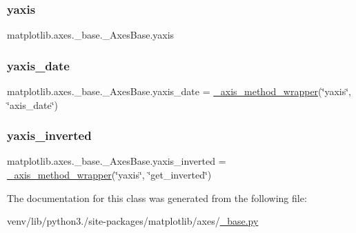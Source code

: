 \subsubsection{\texorpdfstring{yaxis}{yaxis}}
{\footnotesize\ttfamily matplotlib.\+axes.\+\_\+base.\+\_\+\+Axes\+Base.\+yaxis}

\mbox{\label{classmatplotlib_1_1axes_1_1__base_1_1__AxesBase_a678a7fa9e1dc60857f1a9dc5306e2e4a}} 
\subsubsection{\texorpdfstring{yaxis\+\_\+date}{yaxis\_date}}
{\footnotesize\ttfamily matplotlib.\+axes.\+\_\+base.\+\_\+\+Axes\+Base.\+yaxis\+\_\+date = \hyperlink{classmatplotlib_1_1axes_1_1__base_1_1__axis__method__wrapper}{\+\_\+axis\+\_\+method\+\_\+wrapper}(\char`\"{}yaxis\char`\"{}, \char`\"{}axis\+\_\+date\char`\"{})\hspace{0.3cm}{\ttfamily [static]}}

\mbox{\label{classmatplotlib_1_1axes_1_1__base_1_1__AxesBase_acbda8c6ae3c0395bc93cd02b1c0c5e33}} 
\subsubsection{\texorpdfstring{yaxis\+\_\+inverted}{yaxis\_inverted}}
{\footnotesize\ttfamily matplotlib.\+axes.\+\_\+base.\+\_\+\+Axes\+Base.\+yaxis\+\_\+inverted = \hyperlink{classmatplotlib_1_1axes_1_1__base_1_1__axis__method__wrapper}{\+\_\+axis\+\_\+method\+\_\+wrapper}(\char`\"{}yaxis\char`\"{}, \char`\"{}get\+\_\+inverted\char`\"{})\hspace{0.3cm}{\ttfamily [static]}}



The documentation for this class was generated from the following file\+:\begin{DoxyCompactItemize}
\item 
venv/lib/python3./site-\/packages/matplotlib/axes/\hyperlink{matplotlib_2axes_2__base_8py}{\+\_\+base.\+py}\end{DoxyCompactItemize}
